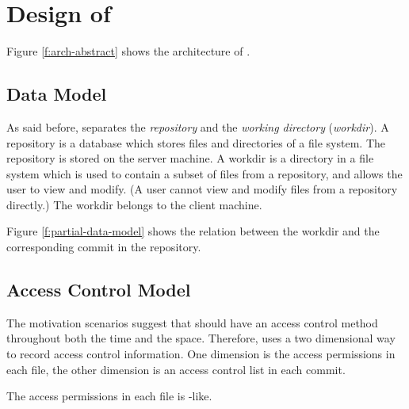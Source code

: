 \section{Design of \sys}
\label{s:design}



Figure \ref{f:arch-abstract}  shows the architecture of \sys.

\subsection{Data Model}

As said before, \sys separates the \emph{repository} and the \emph{working
directory} (\emph{workdir}). A repository is a database which stores files
and directories of a file system. The repository is stored on the server
machine. A workdir is a directory in a file system which is used to
contain a subset of files from a repository, and allows the user to view and
modify. (A user cannot view and modify files from a repository directly.) The
workdir belongs to the client machine.



Figure \ref{f:partial-data-model} shows the relation between the workdir and the
corresponding commit in the repository. 

\subsection{Access Control Model}

The motivation scenarios suggest that \sys should have an access control method
throughout both the time and the space. 
Therefore, \sys uses a two dimensional  way to record
access control information. One dimension is the access permissions in each
file, the other dimension is an access control list in each commit.

The access permissions in each file is \unix-like.

